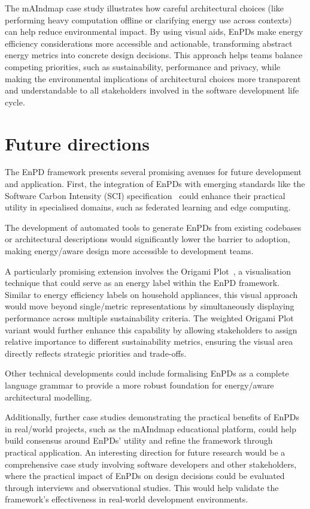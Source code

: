 The mAIndmap case study illustrates how careful architectural choices (like performing heavy computation offline or clarifying energy use across contexts) can help reduce environmental impact.
By using visual aids, EnPDs make energy efficiency considerations more accessible and actionable, transforming abstract energy metrics into concrete design decisions.
This approach helps teams balance competing priorities, such as sustainability, performance and privacy, while making the environmental implications of architectural choices more transparent and understandable to all stakeholders involved in the software development life cycle.

\section{Future directions}
The EnPD framework presents several promising avenues for future development and application.
First, the integration of EnPDs with emerging standards like the Software Carbon Intensity (SCI) specification~\cite{dodge2022measuring} could enhance their practical utility in specialised domains, such as federated learning and edge computing.

The development of automated tools to generate EnPDs from existing codebases or architectural descriptions would significantly lower the barrier to adoption, making energy\-/aware design more accessible to development teams.

A particularly promising extension involves the Origami Plot~\cite{duan2023origami}, a visualisation technique that could serve as an energy label within the EnPD framework.
Similar to energy efficiency labels on household appliances, this visual approach would move beyond single\-/metric representations by simultaneously displaying performance across multiple sustainability criteria.
The weighted Origami Plot variant would further enhance this capability by allowing stakeholders to assign relative importance to different sustainability metrics, ensuring the visual area directly reflects strategic priorities and trade-offs.

Other technical developments could include formalising EnPDs as a complete language grammar to provide a more robust foundation for energy\-/aware architectural modelling.

Additionally, further case studies demonstrating the practical benefits of EnPDs in real\-/world projects, such as the mAIndmap educational platform, could help build consensus around EnPDs' utility and refine the framework through practical application.
An interesting direction for future research would be a comprehensive case study involving software developers and other stakeholders, where the practical impact of EnPDs on design decisions could be evaluated through interviews and observational studies.
This would help validate the framework's effectiveness in real-world development environments.

